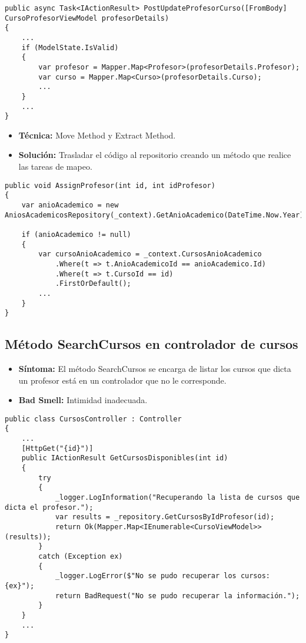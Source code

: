\begin{lstlisting}[language={[Sharp]C}]
public async Task<IActionResult> PostUpdateProfesorCurso([FromBody] CursoProfesorViewModel profesorDetails)
{
	...
	if (ModelState.IsValid)
	{
		var profesor = Mapper.Map<Profesor>(profesorDetails.Profesor);
		var curso = Mapper.Map<Curso>(profesorDetails.Curso);
		...
	}
	...
}
\end{lstlisting}

\begin{itemize}
	\item \textbf{Técnica:} Move Method y Extract Method.
	\item \textbf{Solución:} Trasladar el código al repositorio creando un método que realice las tareas de mapeo.
\end{itemize}

\begin{lstlisting}[language={[Sharp]C}]
public void AssignProfesor(int id, int idProfesor)
{
	var anioAcademico = new AniosAcademicosRepository(_context).GetAnioAcademico(DateTime.Now.Year);
	
	if (anioAcademico != null)
	{
		var cursoAnioAcademico = _context.CursosAnioAcademico
			.Where(t => t.AnioAcademicoId == anioAcademico.Id)
			.Where(t => t.CursoId == id)
			.FirstOrDefault();	
		...
	}
}
\end{lstlisting}


\subsection{Método SearchCursos en controlador de cursos}
\begin{itemize}
	\item \textbf{Síntoma:} El método SearchCursos se encarga de listar los cursos que dicta un profesor está en un controlador que no le corresponde.
	\item \textbf{Bad Smell:} Intimidad inadecuada.
\end{itemize}

\begin{lstlisting}[language={[Sharp]C}]
public class CursosController : Controller
{
	...	
	[HttpGet("{id}")]
	public IActionResult GetCursosDisponibles(int id)
	{
		try
		{
			_logger.LogInformation("Recuperando la lista de cursos que dicta el profesor.");
			var results = _repository.GetCursosByIdProfesor(id);
			return Ok(Mapper.Map<IEnumerable<CursoViewModel>>(results));
		}
		catch (Exception ex)
		{
			_logger.LogError($"No se pudo recuperar los cursos: {ex}");
			return BadRequest("No se pudo recuperar la información.");
		}
	}	
	...
}
\end{lstlisting}

